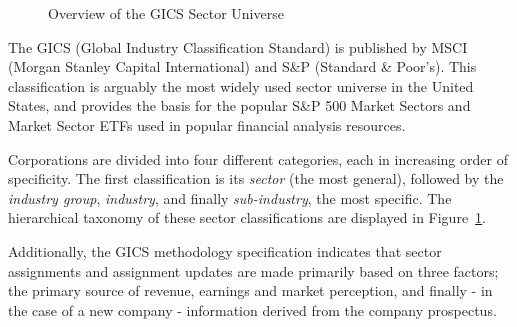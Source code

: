 \documentclass[../main.tex]{subfiles}
\begin{document}
\begin{figure}
    \centering
    \vspace{\wrapfigadjustment}
    \caption{Overview of the GICS Sector Universe}
    \label{fig:introduction:gics_breakdown}
\end{figure}

The GICS (Global Industry Classification Standard) is published by MSCI (Morgan Stanley Capital International) and S\&P (Standard \& Poor's). This classification is arguably the most widely used sector universe in the United States, and provides the basis for the popular S\&P 500 Market Sectors and Market Sector ETFs used in popular financial analysis resources.

Corporations are divided into four different categories, each in increasing order of specificity. The first classification is its \textit{sector} (the most general), followed by the \textit{industry group}, \textit{industry}, and finally \textit{sub-industry}, the most specific. The hierarchical taxonomy of these sector classifications are displayed in Figure~\ref{fig:introduction:gics_breakdown}.

Additionally, the GICS methodology specification indicates that sector assignments and assignment updates are made primarily based on three factors; the primary source of revenue, earnings and market perception, and finally - in the case of a new company - information derived from the company prospectus.
\end{document}
